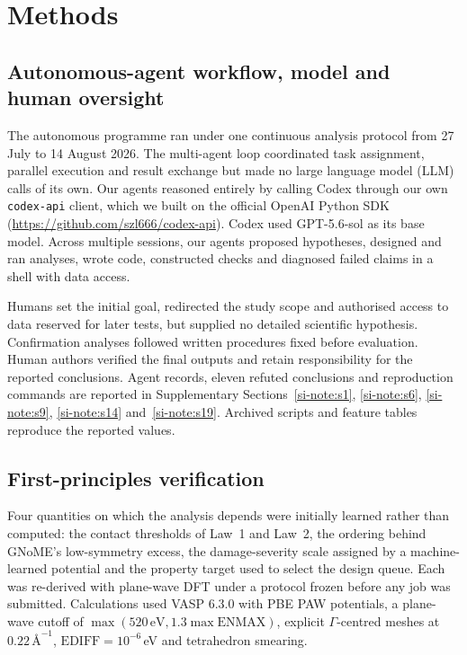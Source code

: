 \section{Methods}

\subsection{Autonomous-agent workflow, model and human oversight}

The autonomous programme ran under one continuous analysis protocol from 27 July to
14 August 2026. The multi-agent loop coordinated task assignment, parallel execution and
result exchange but made no large language model (LLM) calls of its own. Our agents reasoned
entirely by calling Codex through our own \texttt{codex-api} client, which we built on the
official OpenAI Python SDK
(\url{https://github.com/szl666/codex-api}). Codex used GPT-5.6-sol as its base model.
Across multiple sessions, our agents proposed hypotheses, designed and ran analyses, wrote
code, constructed checks and diagnosed failed claims in a shell with data access.

Humans set the initial goal, redirected the study scope and authorised access to data
reserved for later tests, but supplied no detailed scientific hypothesis. Confirmation
analyses followed written procedures fixed before evaluation. Human authors verified the
final outputs and retain responsibility for the reported conclusions. Agent records,
eleven refuted conclusions and reproduction commands are reported in Supplementary
Sections~\ref{si-note:s1}, \ref{si-note:s6}, \ref{si-note:s9}, \ref{si-note:s14}
and~\ref{si-note:s19}. Archived scripts and feature tables reproduce the reported values.

\subsection{First-principles verification}

Four quantities on which the analysis depends were initially learned rather than computed:
the contact thresholds of Law~1 and Law~2, the ordering behind GNoME's low-symmetry
excess, the damage-severity scale assigned by a machine-learned potential and the property
target used to select the design queue. Each was re-derived with plane-wave DFT under a protocol frozen
before any job was submitted. Calculations used VASP 6.3.0 with PBE PAW potentials, a
plane-wave cutoff of \(\max(520\,\mathrm{eV},1.3\max\mathrm{ENMAX})\), explicit
\(\Gamma\)-centred meshes at \(0.22\,\text{\AA}^{-1}\),
\(\mathrm{EDIFF}=10^{-6}\)\,eV and tetrahedron smearing.

